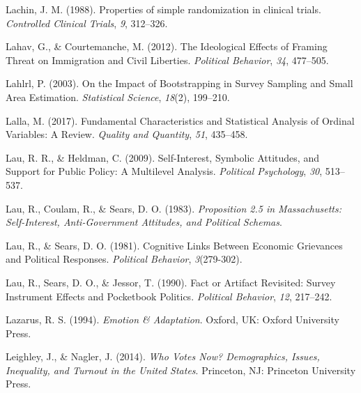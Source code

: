 \documentclass[12pt,econ]{sources/authesis}
\newenvironment{CSLReferences}%
  {}%
  {\par}
\begin{document}
\begin{CSLReferences}{1}{0}
\leavevmode{}%
Lachin, J. M. (1988). Properties of simple randomization in clinical trials. \emph{Controlled Clinical Trials}, \emph{9}, 312--326.

\leavevmode{}%
Lahav, G., \& Courtemanche, M. (2012). The {Ideological} {Effects} of {Framing} {Threat} on {Immigration} and {Civil} {Liberties}. \emph{Political Behavior}, \emph{34}, 477--505.

\leavevmode{}%
Lahlrl, P. (2003). {On the Impact of Bootstrapping in Survey Sampling and Small Area Estimation}. \emph{Statistical Science}, \emph{18}(2), 199--210.

\leavevmode{}%
Lalla, M. (2017). {Fundamental Characteristics and Statistical Analysis of Ordinal Variables: A Review}. \emph{Quality and Quantity}, \emph{51}, 435--458.

\leavevmode{}%
Lau, R. R., \& Heldman, C. (2009). {Self-Interest, Symbolic Attitudes, and Support for Public Policy: A Multilevel Analysis}. \emph{Political Psychology}, \emph{30}, 513--537.

\leavevmode{}%
Lau, R., Coulam, R., \& Sears, D. O. (1983). \emph{Proposition 2.5 in {Massachusetts}: {Self}-{Interest}, {Anti}-{Government} {Attitudes}, and {Political} {Schemas}}.

\leavevmode{}%
Lau, R., \& Sears, D. O. (1981). Cognitive {Links} {Between} {Economic} {Grievances} and {Political} {Responses}. \emph{Political Behavior}, \emph{3}(279-302).

\leavevmode{}%
Lau, R., Sears, D. O., \& Jessor, T. (1990). Fact or {Artifact} {Revisited}: {Survey} {Instrument} {Effects} and {Pocketbook} {Politics}. \emph{Political Behavior}, \emph{12}, 217--242.

\leavevmode{}%
Lazarus, R. S. (1994). \emph{{Emotion \& Adaptation}}. Oxford, UK: Oxford University Press.

\leavevmode{}%
Leighley, J., \& Nagler, J. (2014). \emph{Who {Votes} {Now}? {Demographics}, {Issues}, {Inequality}, and {Turnout} in the {United} {States}}. Princeton, NJ: Princeton University Press.


\end{CSLReferences}
\end{document}
